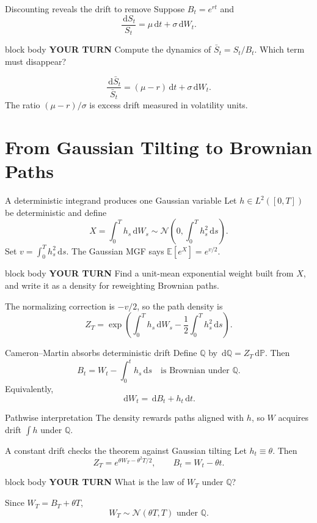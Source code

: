 \documentclass[handout,10pt,aspectratio=169]{beamer}
\newenvironment{pausebox}{\begin{beamercolorbox}[rounded=true,sep=0.8em,wd=\textwidth]{block body}
  \textbf{\color{CourseGold}YOUR TURN}\quad}{\end{beamercolorbox}}
\newcommand{\dd}{\,\mathrm d}
\newcommand{\E}{\mathbb E}
\newcommand{\Pp}{\mathbb P}
\newcommand{\Q}{\mathbb Q}
\newcommand{\1}{\mathbf 1}
\newcommand{\Nlaw}{\mathcal N}
\begin{document}
\begin{frame}{Discounting reveals the drift to remove}
Suppose \(B_t=e^{rt}\) and
\[
\frac{\dd S_t}{S_t}=\mu\dd t+\sigma\dd W_t.
\]
\begin{pausebox}
Compute the dynamics of \(\bar S_t=S_t/B_t\). Which term must disappear?
\end{pausebox}

\[
\boxed{\frac{\dd\bar S_t}{\bar S_t}
=(\mu-r)\dd t+\sigma\dd W_t.}
\]
The ratio \((\mu-r)/\sigma\) is excess drift measured in volatility units.
\end{frame}



\section{From Gaussian Tilting to Brownian Paths}

\begin{frame}{A deterministic integrand produces one Gaussian variable}
Let \(h\in L^2([0,T])\) be deterministic and define
\[
X=\int_0^T h_s\dd W_s
\sim\Nlaw\!\left(0,\int_0^T h_s^2\dd s\right).
\]
Set \(v=\int_0^T h_s^2\dd s\). The Gaussian MGF says
\(\E[e^X]=e^{v/2}\).
\begin{pausebox}
Find a unit-mean exponential weight built from \(X\), and write it as a
density for reweighting Brownian paths.
\end{pausebox}

The normalizing correction is \(-v/2\), so the path density is
\[
\boxed{
Z_T=\exp\!\left(
\int_0^T h_s\dd W_s-\frac12\int_0^T h_s^2\dd s
\right).}
\]
\end{frame}


\begin{frame}{Cameron--Martin absorbs deterministic drift}
Define \(\Q\) by \(\dd\Q=Z_T\dd\Pp\). Then
\[
\boxed{
B_t=W_t-\int_0^th_s\dd s
\quad\text{is Brownian under }\Q.}
\]
Equivalently,
\[
\dd W_t=\dd B_t+h_t\dd t.
\]
\begin{block}{Pathwise interpretation}
The density rewards paths aligned with \(h\), so \(W\) acquires drift
\(\int h\) under \(\Q\).
\end{block}
\end{frame}

\begin{frame}{A constant drift checks the theorem against Gaussian tilting}
Let \(h_t\equiv\theta\). Then
\[
Z_T=e^{\theta W_T-\theta^2T/2},
\qquad B_t=W_t-\theta t.
\]
\begin{pausebox}
What is the law of \(W_T\) under \(\Q\)?
\end{pausebox}

Since \(W_T=B_T+\theta T\),
\[
\boxed{W_T\sim\Nlaw(\theta T,T)\text{ under }\Q.}
\]
\end{frame}
\end{document}
